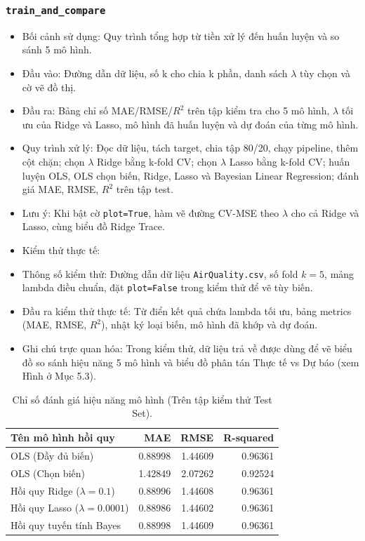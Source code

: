 \documentclass[a4paper]{article}
\newcommand{\code}[1]{\colorbox{light-gray}{\texttt{#1}}}
\begin{document}
\subsubsection{\code{train\_and\_compare}}
\begin{itemize}[leftmargin=*]
    \item Bối cảnh sử dụng: Quy trình tổng hợp từ tiền xử lý đến huấn luyện và so sánh 5 mô hình.
    \item Đầu vào: Đường dẫn dữ liệu, số k cho chia k phần, danh sách $\lambda$ tùy chọn và cờ vẽ đồ thị.
    \item Đầu ra: Bảng chỉ số MAE/RMSE/$R^2$ trên tập kiểm tra cho 5 mô hình, $\lambda$ tối ưu của Ridge và Lasso, mô hình đã huấn luyện và dự đoán của từng mô hình.
    \item Quy trình xử lý: Đọc dữ liệu, tách target, chia tập 80/20, chạy pipeline, thêm cột chặn; chọn $\lambda$ Ridge bằng k-fold CV; chọn $\lambda$ Lasso bằng k-fold CV; huấn luyện OLS, OLS chọn biến, Ridge, Lasso và Bayesian Linear Regression; đánh giá MAE, RMSE, $R^2$ trên tập test.
    \item Lưu ý: Khi bật cờ \texttt{plot=True}, hàm vẽ đường CV-MSE theo $\lambda$ cho cả Ridge và Lasso, cùng biểu đồ Ridge Trace.
    \item Kiểm thử thực tế:
    \item Thông số kiểm thử: Đường dẫn dữ liệu \texttt{AirQuality.csv}, số fold $k=5$, mảng lambda điều chuẩn, đặt \texttt{plot=False} trong kiểm thử để vẽ tùy biến.
    \item Đầu ra kiểm thử thực tế: Từ điển kết quả chứa lambda tối ưu, bảng metrics (MAE, RMSE, $R^2$), nhật ký loại biến, mô hình đã khớp và dự đoán.
    \item Ghi chú trực quan hóa: Trong kiểm thử, dữ liệu trả về được dùng để vẽ biểu đồ so sánh hiệu năng 5 mô hình và biểu đồ phân tán Thực tế vs Dự báo (xem Hình ở Mục 5.3).
\end{itemize}
\begin{table}[H]
    \centering
    \small
    \begin{tabular}{lrrr}
    \toprule
    \textbf{Tên mô hình hồi quy} & \textbf{MAE} & \textbf{RMSE} & \textbf{R-squared} \\
    \midrule
    OLS (Đầy đủ biến) & 0.88998 & 1.44609 & 0.96361 \\
    OLS (Chọn biến) & 1.42849 & 2.07262 & 0.92524 \\
    Hồi quy Ridge ($\lambda=0.1$) & 0.88996 & 1.44608 & 0.96361 \\
    Hồi quy Lasso ($\lambda=0.0001$) & 0.88986 & 1.44602 & 0.96361 \\
    Hồi quy tuyến tính Bayes & 0.88998 & 1.44609 & 0.96361 \\
    \bottomrule
    \end{tabular}
    \caption{Chỉ số đánh giá hiệu năng mô hình (Trên tập kiểm thử Test Set).}
\end{table}
\end{document}
